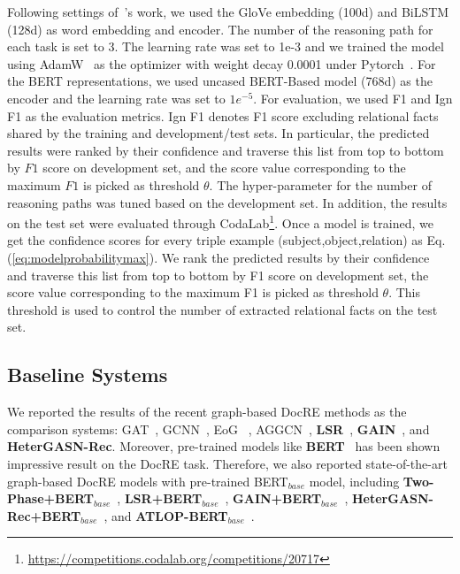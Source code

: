 \documentclass[11pt,a4paper]{article}
\begin{document}
Following settings of~\citeauthor{yao-etal-2019-docred}'s work, we used the GloVe embedding (100d) and BiLSTM (128d) as word embedding and encoder.
The number of the reasoning path for each task is set to 3.
The learning rate was set to 1e-3 and we trained the model using AdamW~\cite{adamw2019} as the optimizer with weight decay 0.0001 under Pytorch~\cite{paszke2017pytorch}.
For the BERT representations, we used uncased BERT-Based model (768d) as the encoder and the learning rate was set to $1e^{-5}$.
For evaluation, we used F1 and Ign F1 as the evaluation metrics. 
Ign F1 denotes F1 score excluding relational facts shared by the training and development/test sets.
In particular, the predicted results were ranked by their confidence and traverse this list from top to bottom by $F1$ score on development set, and the score value corresponding to the maximum $F1$ is picked as threshold $\theta$.
The hyper-parameter for the number of reasoning paths was tuned based on the development set.
In addition, the results on the test set were evaluated through CodaLab\footnote{\url{https://competitions.codalab.org/competitions/20717}}.
Once a model is trained, we get the confidence scores for every triple example (subject,object,relation) as Eq.(\ref{eq:modelprobabilitymax}). 
We rank the predicted results by their confidence and traverse this list from top to bottom by F1 score on development set, the score value corresponding to the maximum F1 is picked as threshold $\theta$. 
This threshold is used to control the number of extracted relational facts on the test set.

\subsection{Baseline Systems}
\label{sec4-2}
We reported the results of the recent graph-based DocRE methods as the comparison systems: GAT~\cite{Velickovic2018GraphAN}, GCNN~\cite{sahu-etal-2019-inter}, EoG ~\cite{Christopoulou2019ConnectingTD}, AGGCN~\cite{guo-etal-2019-attention}, \textbf{LSR}~\cite{Nan2020ReasoningWL}, \textbf{GAIN}~\cite{zeng-etal-2020-double}, and \textbf{HeterGASN-Rec}\cite{docred-rec}.
Moreover, pre-trained models like \textbf{BERT}~\cite{devlin-etal-2019-bert} has been shown impressive result on the DocRE task.
Therefore, we also reported state-of-the-art graph-based DocRE models with pre-trained BERT$_{base}$ model, including 
\textbf{Two-Phase+BERT$_{base}$}~\cite{Wang2019FinetuneBF}, 
\textbf{LSR+BERT$_{base}$}~\cite{Nan2020ReasoningWL},
\textbf{GAIN+BERT$_{base}$}~\cite{zeng-etal-2020-double}, 
\textbf{HeterGASN-Rec+BERT$_{base}$}~\cite{docred-rec}, and \textbf{ATLOP-BERT$_{base}$}~\cite{zhou2021atlop}. 
\end{document}
